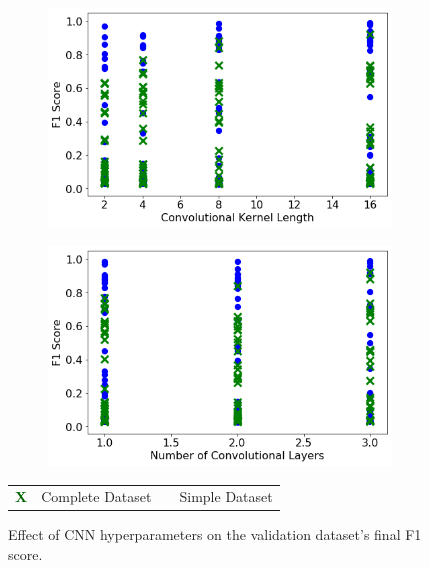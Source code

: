 \begin{figure}[H]
     \begin{subfigure}[b]{0.49\textwidth}
         \centering
         \includegraphics[width=\textwidth]{images/cnn_kernel_length.png}
         \caption{}
         \label{fig:cnn_kernel_length}
     \end{subfigure}
     \hfill
     \begin{subfigure}[b]{0.49\textwidth}
         \centering
         \includegraphics[width=\textwidth]{images/cnn_num_conv_layers.png}
         \caption{}
         \label{fig:cnn_num_conv_layers}
     \end{subfigure}  
	\begin{tabular}{r@{ : }l r@{ : }l}
		\textcolor{darkgreen}{\textbf{\large{X}}} & Complete Dataset & \bluecircle & Simple Dataset \\
	\end{tabular}
    \caption{Effect of CNN hyperparameters on the validation dataset's final F1 score.}
\end{figure}

